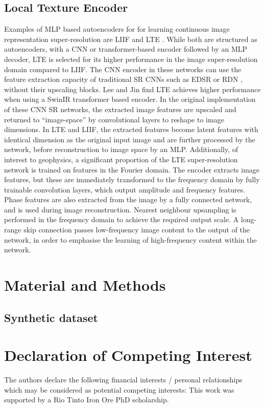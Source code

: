 \documentclass{article}
\begin{document}
\subsection{Local Texture Encoder}
Examples of MLP based autoencoders for for learning continuous image representation super-resolution are LIIF \cite{chenLearningContinuousImage2021} and  LTE \cite{leeLocalTextureEstimator2022}.
While both are structured as autoencoders, with a CNN or transformer-based encoder followed by an MLP decoder, LTE is selected for its higher performance in the image super-resolution domain compared to LIIF\@.
The CNN encoder in these networks can use the feature extraction capacity of traditional SR CNNs such as EDSR \parencite{limEnhancedDeepResidual2017} or RDN \parencite{zhangResidualDenseNetwork2018}, without their upscaling blocks.
Lee and Jin find LTE achieves higher performance when using a SwinIR transformer based encoder.
In the original implementation of these CNN SR networks, the extracted image features are upscaled and returned to “image-space” by convolutional layers to reshape to image dimensions.
In LTE and LIIF, the extracted features become latent features with identical dimension as the original input image and are further processed by the network, before reconstruction to image space by an MLP\@.
Additionally, of interest to geophysics, a significant proportion of the LTE super-resolution network is trained on features in the Fourier domain.
The encoder extracts image features, but these are immediately transformed to the frequency domain by fully trainable convolution layers, which output amplitude and frequency features.
Phase features are also extracted from the image by a fully connected network, and is used during image reconstruction.
Nearest neighbour upsampling is performed in the frequency domain to achieve the required output scale.
A long-range skip connection passes low-frequency image content to the output of the network, in order to emphasise the learning of high-frequency content within the network.

\section{Material and Methods}
\subsection{Synthetic dataset}

\section{Declaration of Competing Interest}
The authors declare the following financial interests / personal relationships which may be considered as potential competing interests: This work was supported by a Rio Tinto Iron Ore PhD scholarship.

\printbibliography{}
\end{document}
